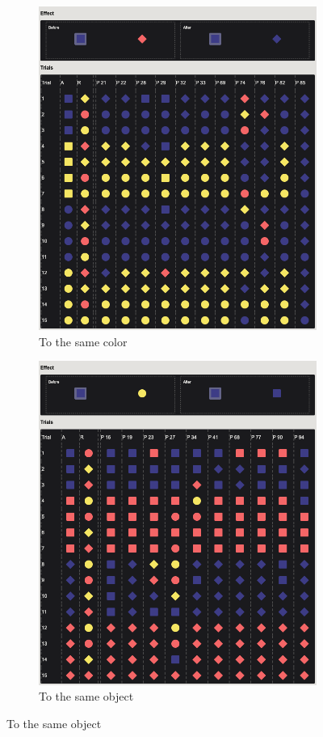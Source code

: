 \documentclass{article}
\begin{document}
\begin{figure}[h!]
\begin{subfigure}[t]{0.32\textwidth}
  	\includegraphics[width=\linewidth]{learn03} 
  	\caption{To the same color} \label{fig:learn03}
  \end{subfigure}
  \hfill
  \begin{subfigure}[t]{0.32\textwidth}
  	\centering
  	\includegraphics[width=\linewidth]{learn06} 
  	\caption{To the same object} \label{fig:learn06}
  \end{subfigure}


\end{figure}
\end{document}
